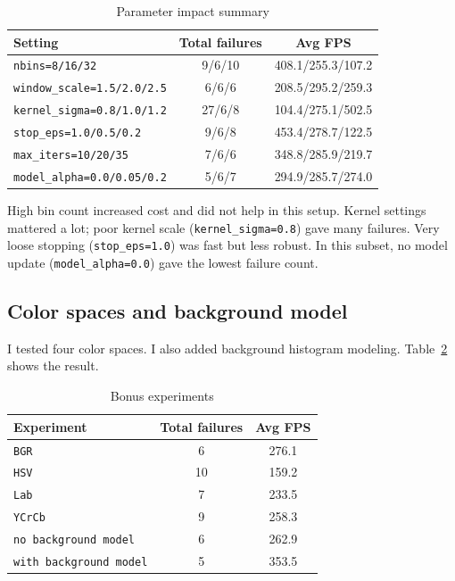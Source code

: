 \documentclass[9pt]{IEEEtran}
\begin{document}
\begin{table}[h]
    \centering
    \caption{Parameter impact summary}
    \label{tab:param_impact}
    \begin{tabular}{lcc}
        \toprule
        Setting                            & Total failures & Avg FPS           \\
        \midrule
        \texttt{nbins=8/16/32}             & 9/6/10         & 408.1/255.3/107.2 \\
        \texttt{window\_scale=1.5/2.0/2.5} & 6/6/6          & 208.5/295.2/259.3 \\
        \texttt{kernel\_sigma=0.8/1.0/1.2} & 27/6/8         & 104.4/275.1/502.5 \\
        \texttt{stop\_eps=1.0/0.5/0.2}     & 9/6/8          & 453.4/278.7/122.5 \\
        \texttt{max\_iters=10/20/35}       & 7/6/6          & 348.8/285.9/219.7 \\
        \texttt{model\_alpha=0.0/0.05/0.2} & 5/6/7          & 294.9/285.7/274.0 \\
        \bottomrule
    \end{tabular}
\end{table}

High bin count increased cost and did not help in this setup.
Kernel settings mattered a lot; poor kernel scale (\texttt{kernel\_sigma=0.8}) gave many failures.
Very loose stopping (\texttt{stop\_eps=1.0}) was fast but less robust.
In this subset, no model update (\texttt{model\_alpha=0.0}) gave the lowest failure count.

\subsection{Color spaces and background model}
I tested four color spaces.
I also added background histogram modeling.
Table~\ref{tab:bonus} shows the result.

\begin{table}[h]
    \centering
    \caption{Bonus experiments}
    \label{tab:bonus}
    \begin{tabular}{lcc}
        \toprule
        Experiment                     & Total failures & Avg FPS \\
        \midrule
        \texttt{BGR}                   & 6              & 276.1   \\
        \texttt{HSV}                   & 10             & 159.2   \\
        \texttt{Lab}                   & 7              & 233.5   \\
        \texttt{YCrCb}                 & 9              & 258.3   \\
        \texttt{no background model}   & 6              & 262.9   \\
        \texttt{with background model} & 5              & 353.5   \\
        \bottomrule
    \end{tabular}
\end{table}
\end{document}
